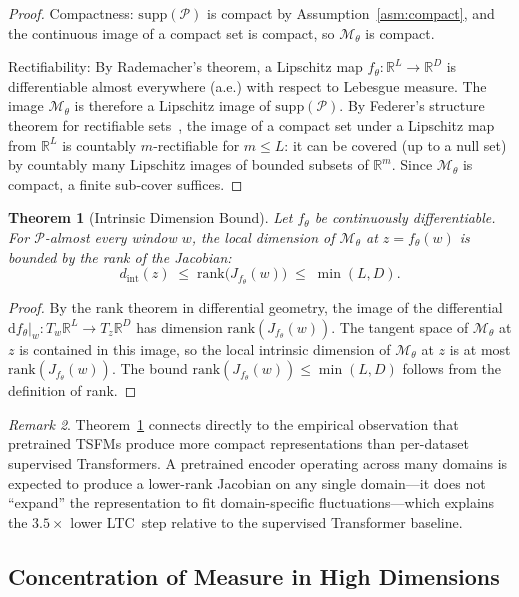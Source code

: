\documentclass[12pt]{article}
\newtheorem{theorem}{Theorem}[section]
\theoremstyle{definition}
\theoremstyle{remark}
\newtheorem{remark}[theorem]{Remark}
\newcommand{\R}{\mathbb{R}}
\newcommand{\Pset}{\mathcal{P}}
\newcommand{\trm}{\mathcal{M}_\theta}
\newcommand{\dint}{d_{\mathrm{int}}}
\begin{document}
\begin{proof}
Compactness: $\mathrm{supp}(\Pset)$ is compact by Assumption~\ref{asm:compact},
and the continuous image of a compact set is compact, so $\trm$ is compact.

Rectifiability: By Rademacher's theorem, a Lipschitz map
$f_\theta : \R^L \to \R^D$ is differentiable almost everywhere (a.e.) with
respect to Lebesgue measure. The image $\trm$ is therefore a Lipschitz image
of $\mathrm{supp}(\Pset)$. By Federer's structure theorem for rectifiable
sets~\citep{federer1969geometric}, the image of a compact set under a
Lipschitz map from $\R^L$ is countably $m$-rectifiable for $m \leq L$:
it can be covered (up to a null set) by countably many Lipschitz images of
bounded subsets of $\R^m$. Since $\trm$ is compact, a finite sub-cover
suffices.
\end{proof}

\begin{theorem}[Intrinsic Dimension Bound]
\label{thm:id_bound}
Let $f_\theta$ be continuously differentiable. For
$\Pset$-almost every window $w$, the local dimension of $\trm$ at
$z = f_\theta(w)$ is bounded by the rank of the Jacobian:
\[
  \dint(z) \;\leq\; \mathrm{rank}\!\bigl(J_{f_\theta}(w)\bigr) \;\leq\; \min(L, D).
\]
\end{theorem}

\begin{proof}
By the rank theorem in differential geometry, the image of the differential
$\mathrm{d}f_\theta|_w : T_w\R^L \to T_z\R^D$ has dimension
$\mathrm{rank}(J_{f_\theta}(w))$. The tangent space of $\trm$ at $z$ is
contained in this image, so the local intrinsic dimension of $\trm$ at $z$
is at most $\mathrm{rank}(J_{f_\theta}(w))$. The bound
$\mathrm{rank}(J_{f_\theta}(w)) \leq \min(L, D)$ follows from the definition
of rank.
\end{proof}

\begin{remark}
Theorem~\ref{thm:id_bound} connects directly to the empirical observation
that pretrained TSFMs produce more compact representations than per-dataset
supervised Transformers. A pretrained encoder operating across many domains
is expected to produce a lower-rank Jacobian on any single domain---it does
not ``expand'' the representation to fit domain-specific fluctuations---which
explains the $3.5\times$ lower LTC~step relative to the supervised Transformer
baseline.
\end{remark}

\subsection{Concentration of Measure in High Dimensions}
\end{document}
